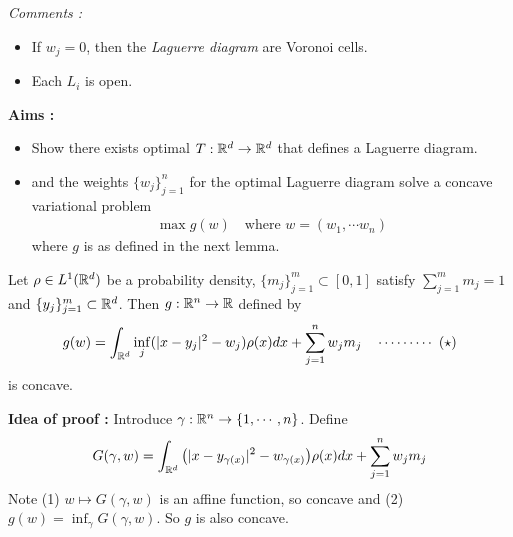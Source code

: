 \documentclass[12pt,a4paper]{article}
\newenvironment{proof}
{\begin{changemargin}{1cm}{0.5cm} 
	}%
	{\end{changemargin}
}
\renewenvironment{i}
{\begin{itemize} 
	}%
	{\end{itemize}
}
\newenvironment{p}
{\begin{proof} 
	}%
	{\end{proof}
}
\begin{document}
\emph{Comments :}
\begin{i}
\item If $w_j =0$, then the \emph{Laguerre diagram} are Voronoi cells.
\item Each $L_i$ is open.
\end{i}
\s

\textbf{Aims :}
\begin{i}
\item Show there exists optimal $T: \mathbb{R}^d \rightarrow \mathbb{R}^d$ that defines a Laguerre diagram.
\item and the weights $\{w_j\}_{j=1}^n$ for the optimal Laguerre diagram solve a concave variational problem
\begin{align*}
\max g(w) \quad \text{where } w= (w_1, \cdots w_n)
\end{align*} 
where $g$ is as defined in the next lemma.
\end{i}
\s

 Let $\rho \in L^1(\mathbb{R}^d)$ be a probability density, $\{m_j \}_{j=1}^m \subset [0,1]$ satisfy $\sum_{j=1}^m m_j =1$ and $\{y_j \}_{j=1}^m \subset \mathbb{R}^d$. Then $g: \mathbb{R}^n \rightarrow \mathbb{R}$ defined by 
\begin{align*}
g(w) = \int_{\mathbb{R}^d} \inf_j (|x-y_j|^2 - w_j) \rho(x) dx + \sum_{j=1}^n w_j m_j \quad \cdots\cdots\cdots\,\,(\star)
\end{align*}
is concave.
\begin{p}
\textbf{Idea of proof :} Introduce $\gamma : \mathbb{R}^n \rightarrow \{1, \cdots, n \}$. Define
\begin{align*}
G(\gamma, w) = \int_{\mathbb{R}^d} \big( |x-y_{\gamma(x)}|^2 - w_{\gamma(x)}\big) \rho(x) dx + \sum_{j=1}^n w_j m_j
\end{align*}
Note (1) $w\mapsto G(\gamma, w)$ is an affine function, so concave and (2) $g(w) = \inf_{\gamma} G(\gamma, w)$. So $g$ is also concave.
\end{p}
\s
\end{document}
